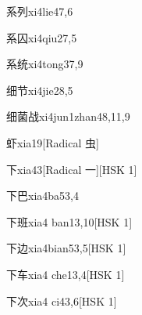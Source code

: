 \begin{entry}{系列}{xi4lie4}{7,6}
\end{entry}

\begin{entry}{系囚}{xi4qiu2}{7,5}
\end{entry}

\begin{entry}{系统}{xi4tong3}{7,9}
\end{entry}

\begin{entry}{细节}{xi4jie2}{8,5}
\end{entry}

\begin{entry}{细菌战}{xi4jun1zhan4}{8,11,9}
\end{entry}

\begin{entry}{虾}{xia1}{9}[Radical 虫]
\end{entry}

\begin{entry}{下}{xia4}{3}[Radical 一][HSK 1]
\end{entry}

\begin{entry}{下巴}{xia4ba5}{3,4}
\end{entry}

\begin{entry}{下班}{xia4 ban1}{3,10}[HSK 1]
\end{entry}

\begin{entry}{下边}{xia4bian5}{3,5}[HSK 1]
\end{entry}

\begin{entry}{下车}{xia4 che1}{3,4}[HSK 1]
\end{entry}

\begin{entry}{下次}{xia4 ci4}{3,6}[HSK 1]
\end{entry}

